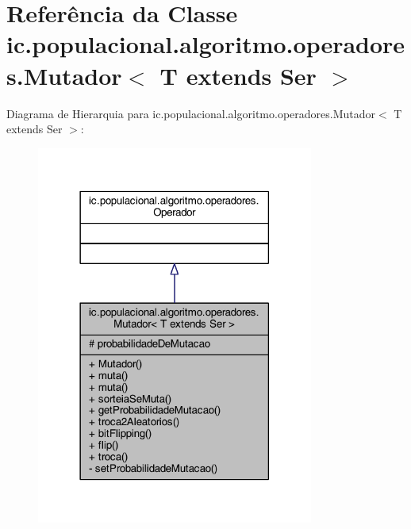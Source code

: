 \hypertarget{classic_1_1populacional_1_1algoritmo_1_1operadores_1_1_mutador_3_01_t_01extends_01_ser_01_4}{\section{Referência da Classe ic.\-populacional.\-algoritmo.\-operadores.\-Mutador$<$ T extends Ser $>$}
\label{classic_1_1populacional_1_1algoritmo_1_1operadores_1_1_mutador_3_01_t_01extends_01_ser_01_4}
}


Diagrama de Hierarquia para ic.\-populacional.\-algoritmo.\-operadores.\-Mutador$<$ T extends Ser $>$\-:
\nopagebreak
\begin{figure}[H]
\begin{center}
\leavevmode
\includegraphics[width=258pt]{classic_1_1populacional_1_1algoritmo_1_1operadores_1_1_mutador_3_01_t_01extends_01_ser_01_4__inherit__graph}
\end{center}
\end{figure}


